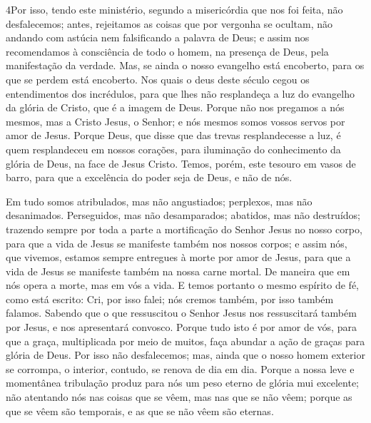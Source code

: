 \lettrine{4} Por isso, tendo este ministério, segundo a
misericórdia que nos foi feita, não desfalecemos; antes,
rejeitamos as coisas que por vergonha se ocultam, não andando com
astúcia nem falsificando a palavra de Deus; e assim nos recomendamos
à consciência de todo o homem, na presença de Deus, pela
manifestação da verdade. Mas, se ainda o nosso evangelho está
encoberto, para os que se perdem está encoberto. Nos quais o
deus deste século cegou os entendimentos dos incrédulos, para que
lhes não resplandeça a luz do evangelho da glória de Cristo, que é a
imagem de Deus. Porque não nos pregamos a nós mesmos, mas a
Cristo Jesus, o Senhor; e nós mesmos somos vossos servos por amor de
Jesus. Porque Deus, que disse que das trevas resplandecesse a
luz, é quem resplandeceu em nossos corações, para iluminação do
conhecimento da glória de Deus, na face de Jesus Cristo. Temos,
porém, este tesouro em vasos de barro, para que a excelência do
poder seja de Deus, e não de nós.

Em tudo somos atribulados, mas não angustiados; perplexos, mas não
desanimados. Perseguidos, mas não desamparados; abatidos, mas
não destruídos; trazendo sempre por toda a parte a
mortificação do Senhor Jesus no nosso corpo, para que a vida de
Jesus se manifeste também nos nossos corpos; e assim nós, que
vivemos, estamos sempre entregues à morte por amor de Jesus, para
que a vida de Jesus se manifeste também na nossa carne mortal.
De maneira que em nós opera a morte, mas em vós a vida.
E temos portanto o mesmo espírito de fé, como está escrito:
Cri, por isso falei; nós cremos também, por isso também falamos.
Sabendo que o que ressuscitou o Senhor Jesus nos ressuscitará
também por Jesus, e nos apresentará convosco. Porque tudo
isto é por amor de vós, para que a graça, multiplicada por meio de
muitos, faça abundar a ação de graças para glória de Deus.
Por isso não desfalecemos; mas, ainda que o nosso homem
exterior se corrompa, o interior, contudo, se renova de dia em dia.
Porque a nossa leve e momentânea tribulação produz para nós
um peso eterno de glória mui excelente; não atentando nós nas
coisas que se vêem, mas nas que se não vêem; porque as que se vêem
são temporais, e as que se não vêem são eternas.

\medskip

